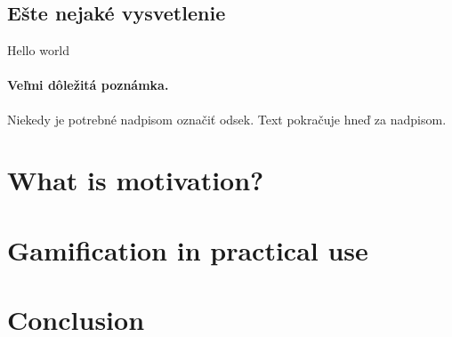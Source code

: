 \documentclass[10pt,twoside,english,a4paper]{article}
\begin{document}
\subsection{Ešte nejaké vysvetlenie} \label{section3:2}
Hello world

\paragraph{Veľmi dôležitá poznámka.}
Niekedy je potrebné nadpisom označiť odsek. Text pokračuje hneď za nadpisom.



\section{What is motivation?} \label{section4}




\section{Gamification in practical use} \label{section5}




\section{Conclusion} \label{section6} %






\end{document}
